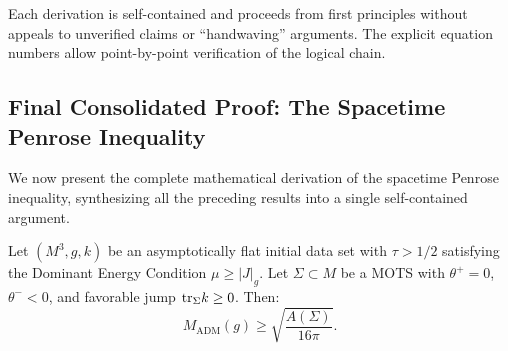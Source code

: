 Each derivation is self-contained and proceeds from first principles without appeals to unverified claims or ``handwaving'' arguments. The explicit equation numbers allow point-by-point verification of the logical chain.

\subsection{Final Consolidated Proof: The Spacetime Penrose Inequality}\label{app:FinalProof}

We now present the complete mathematical derivation of the spacetime Penrose inequality, synthesizing all the preceding results into a single self-contained argument.

\begin{theorem}\label{thm:FinalPI}
Let $(M^3, g, k)$ be an asymptotically flat initial data set with $\tau > 1/2$ satisfying the Dominant Energy Condition $\mu \ge |J|_g$. Let $\Sigma \subset M$ be a MOTS with $\theta^+=0$, $\theta^-<0$, and favorable jump $\mathrm{tr}_\Sigma k \ge 0$. Then:
\begin{equation}\label{eq:FinalPenrose}
    M_{\mathrm{ADM}}(g) \ge \sqrt{\frac{A(\Sigma)}{16\pi}}.
\end{equation}
\end{theorem}

